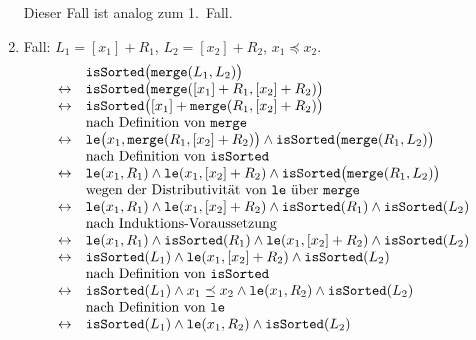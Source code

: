 \begin{enumerate}
      Dieser Fall ist analog zum 1.~Fall.
\item Fall: $L_1 = [x_1] + R_1$,   $L_2 = [x_2] + R_2$, $x_1 \preceq x_2$.
      \[
      \begin{array}{cl}
        & \texttt{isSorted}\bigl(\texttt{merge}(L_1, L_2)\bigr) \\
      \leftrightarrow  & \texttt{isSorted}\bigl(\texttt{merge}([x_1] + R_1, [x_2] + R_2)\bigr) \\
      \leftrightarrow  & \texttt{isSorted}\bigl([x_1] + \texttt{merge}(R_1, [x_2] + R_2)\bigr) \\
                       &          \mbox{nach Definition von \texttt{merge}}  \\
      \leftrightarrow  & \texttt{le}\bigl(x_1,\texttt{merge}(R_1, [x_2] + R_2)\bigr) \wedge 
                         \texttt{isSorted}\bigl(\texttt{merge}(R_1, L_2)\bigr)   \\
                       & \mbox{nach Definition von \texttt{isSorted}}  \\
      \leftrightarrow  & \texttt{le}(x_1,R_1) \wedge \mathtt{le}(x_1, [x_2] + R_2) \wedge 
                          \texttt{isSorted}\bigl(\texttt{merge}(R_1, L_2)\bigr)   \\
                       & \mbox{wegen der Distributivit\"at von \texttt{le} \"uber \texttt{merge}}  \\
      \leftrightarrow  & \texttt{le}(x_1,R_1) \wedge \mathtt{le}(x_1, [x_2] + R_2) \wedge 
                         \texttt{isSorted}(R_1) \wedge \mathtt{isSorted}(L_2) \\
                       & \mbox{nach Induktions-Voraussetzung}  \\
      \leftrightarrow  & \texttt{le}(x_1,R_1) \wedge \texttt{isSorted}(R_1) \wedge \mathtt{le}(x_1, [x_2] + R_2) \wedge \mathtt{isSorted}(L_2) \\
      \leftrightarrow  & \texttt{isSorted}(L_1) \wedge \mathtt{le}(x_1, [x_2] + R_2) \wedge \mathtt{isSorted}(L_2) \\
                       & \mbox{nach Definition von \texttt{isSorted}} \\
      \leftrightarrow  & \texttt{isSorted}(L_1) \wedge x_1 \preceq x_2 \wedge \mathtt{le}(x_1, R_2) \wedge \mathtt{isSorted}(L_2) \\
                       & \mbox{nach Definition von \texttt{le}} \\
      \leftrightarrow  & \texttt{isSorted}(L_1) \wedge \mathtt{le}(x_1, R_2) \wedge \mathtt{isSorted}(L_2) \\

\end{array}\]
\end{enumerate}
